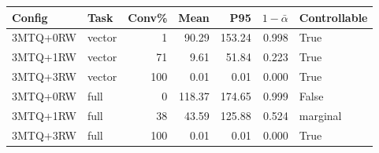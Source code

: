 \begin{tabular}{l l r r r r l}
\hline
Config & Task & Conv\% & Mean & P95 & $1-\bar\alpha$ & Controllable \\
\hline
3MTQ+0RW & vector & 1 & 90.29 & 153.24 & 0.998 & True \\
3MTQ+1RW & vector & 71 & 9.61 & 51.84 & 0.223 & True \\
3MTQ+3RW & vector & 100 & 0.01 & 0.01 & 0.000 & True \\
3MTQ+0RW & full & 0 & 118.37 & 174.65 & 0.999 & False \\
3MTQ+1RW & full & 38 & 43.59 & 125.88 & 0.524 & marginal \\
3MTQ+3RW & full & 100 & 0.01 & 0.01 & 0.000 & True \\
\hline
\end{tabular}

